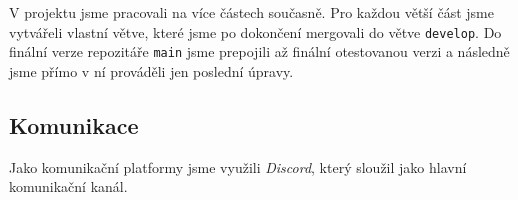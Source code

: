 V projektu jsme pracovali na více částech současně.
Pro každou větší část jsme vytvářeli vlastní větve, které jsme po dokončení mergovali do větve \texttt{develop}.
Do finální verze repozitáře \texttt{main} jsme prepojili až finální otestovanou verzi a následně jsme přímo v ní prováděli jen poslední úpravy.

\subsection{Komunikace}
Jako komunikační platformy jsme využili \textit{Discord}, který sloužil jako hlavní komunikační kanál.
